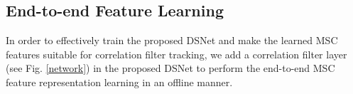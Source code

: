\documentclass[runningheads]{llncs}
\begin{document}

\subsection{End-to-end Feature Learning}
In order to effectively train the proposed DSNet and make the learned MSC features suitable for correlation filter tracking, we add a correlation filter layer (see Fig. \ref{network}) in the proposed DSNet to perform the end-to-end MSC feature representation learning in an offline manner. 
\end{document}
